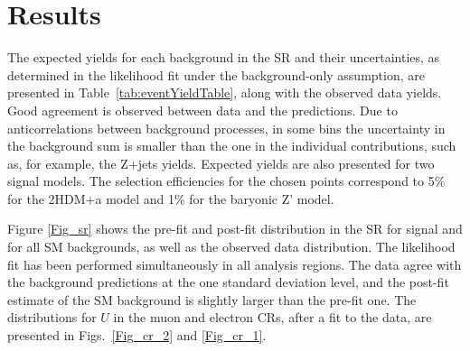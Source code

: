 \section{Results}

The expected yields for each background in the SR and their uncertainties, as determined in the likelihood fit under the background-only assumption, are presented in Table~\ref{tab:eventYieldTable}, along with the observed data yields.
Good agreement is observed between data and the predictions. Due to anticorrelations between background processes, in some bins the uncertainty in the background sum is smaller than the one in the individual contributions, such as, for example, the Z+jets yields. Expected yields are also presented for two signal models. The selection efficiencies for the chosen points correspond to 5\% for the 2HDM+a model and 1\% for the baryonic Z' model. %


Figure \ref{Fig_sr} shows the pre-fit and post-fit \MET distribution in the SR for signal and for all SM backgrounds, as well as the observed data distribution. The likelihood fit has been performed simultaneously in all analysis regions. The data agree with the background predictions at the one standard deviation level, and the post-fit estimate of the SM background is slightly larger than the pre-fit one. The distributions for $U$ in the muon and electron CRs, after a fit to the data, are presented in Figs.~\ref{Fig_cr_2} and \ref{Fig_cr_1}.

